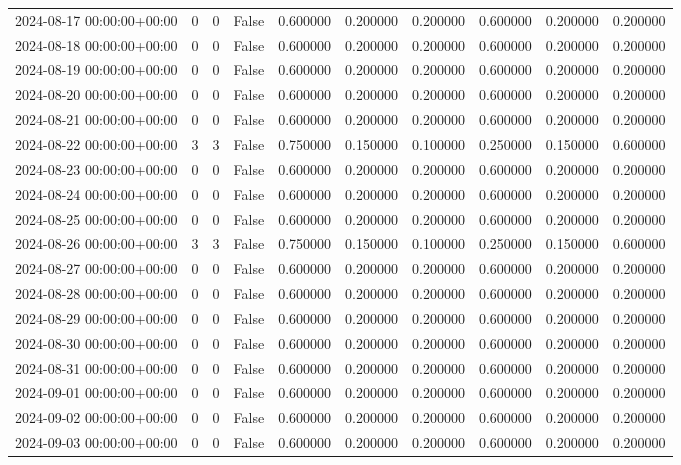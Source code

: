 \begin{tabular}{lrrrrrrrrr}
2024-08-17 00:00:00+00:00 & 0 & 0 & False & 0.600000 & 0.200000 & 0.200000 & 0.600000 & 0.200000 & 0.200000 \\
2024-08-18 00:00:00+00:00 & 0 & 0 & False & 0.600000 & 0.200000 & 0.200000 & 0.600000 & 0.200000 & 0.200000 \\
2024-08-19 00:00:00+00:00 & 0 & 0 & False & 0.600000 & 0.200000 & 0.200000 & 0.600000 & 0.200000 & 0.200000 \\
2024-08-20 00:00:00+00:00 & 0 & 0 & False & 0.600000 & 0.200000 & 0.200000 & 0.600000 & 0.200000 & 0.200000 \\
2024-08-21 00:00:00+00:00 & 0 & 0 & False & 0.600000 & 0.200000 & 0.200000 & 0.600000 & 0.200000 & 0.200000 \\
2024-08-22 00:00:00+00:00 & 3 & 3 & False & 0.750000 & 0.150000 & 0.100000 & 0.250000 & 0.150000 & 0.600000 \\
2024-08-23 00:00:00+00:00 & 0 & 0 & False & 0.600000 & 0.200000 & 0.200000 & 0.600000 & 0.200000 & 0.200000 \\
2024-08-24 00:00:00+00:00 & 0 & 0 & False & 0.600000 & 0.200000 & 0.200000 & 0.600000 & 0.200000 & 0.200000 \\
2024-08-25 00:00:00+00:00 & 0 & 0 & False & 0.600000 & 0.200000 & 0.200000 & 0.600000 & 0.200000 & 0.200000 \\
2024-08-26 00:00:00+00:00 & 3 & 3 & False & 0.750000 & 0.150000 & 0.100000 & 0.250000 & 0.150000 & 0.600000 \\
2024-08-27 00:00:00+00:00 & 0 & 0 & False & 0.600000 & 0.200000 & 0.200000 & 0.600000 & 0.200000 & 0.200000 \\
2024-08-28 00:00:00+00:00 & 0 & 0 & False & 0.600000 & 0.200000 & 0.200000 & 0.600000 & 0.200000 & 0.200000 \\
2024-08-29 00:00:00+00:00 & 0 & 0 & False & 0.600000 & 0.200000 & 0.200000 & 0.600000 & 0.200000 & 0.200000 \\
2024-08-30 00:00:00+00:00 & 0 & 0 & False & 0.600000 & 0.200000 & 0.200000 & 0.600000 & 0.200000 & 0.200000 \\
2024-08-31 00:00:00+00:00 & 0 & 0 & False & 0.600000 & 0.200000 & 0.200000 & 0.600000 & 0.200000 & 0.200000 \\
2024-09-01 00:00:00+00:00 & 0 & 0 & False & 0.600000 & 0.200000 & 0.200000 & 0.600000 & 0.200000 & 0.200000 \\
2024-09-02 00:00:00+00:00 & 0 & 0 & False & 0.600000 & 0.200000 & 0.200000 & 0.600000 & 0.200000 & 0.200000 \\
2024-09-03 00:00:00+00:00 & 0 & 0 & False & 0.600000 & 0.200000 & 0.200000 & 0.600000 & 0.200000 & 0.200000 \\

\end{tabular}
